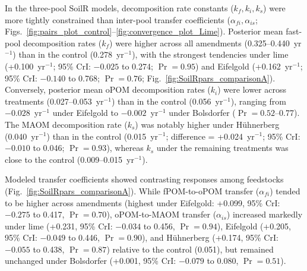 \documentclass[preprint,12pt]{elsarticle}
\begin{document}
In the three-pool SoilR models, decomposition rate constants ($k_f, k_i, k_s$) were more tightly constrained than inter-pool transfer coefficients ($\alpha_{fi}, \alpha_{is}$; Figs.~\ref{fig:pairs_plot_control}--\ref{fig:convergence_plot_Lime}). Posterior mean fast-pool decomposition rates ($k_f$) were higher across all amendments (0.325--0.440~yr$^{-1}$) than in the control (0.278~yr$^{-1}$), with the strongest tendencies under lime (+0.100~yr$^{-1}$; 95\% CrI: $-0.025$ to 0.274; $\Pr = 0.95$) and Eifelgold (+0.162~yr$^{-1}$; 95\% CrI: $-0.140$ to 0.768; $\Pr = 0.76$; Fig.~\ref{fig:SoilRpars_comparisonA}). Conversely, posterior mean oPOM decomposition rates ($k_i$) were lower across treatments (0.027--0.053~yr$^{-1}$) than in the control (0.056~yr$^{-1}$), ranging from $-0.028$~yr$^{-1}$ under Eifelgold to $-0.002$~yr$^{-1}$ under Bolsdorfer ($\Pr = 0.52$--0.77). The MAOM decomposition rate ($k_s$) was notably higher under H\"uhnerberg (0.040~yr$^{-1}$) than in the control (0.015~yr$^{-1}$; difference = +0.024~yr$^{-1}$; 95\% CrI: $-0.010$ to 0.046; $\Pr = 0.93$), whereas $k_s$ under the remaining treatments was close to the control (0.009--0.015~yr$^{-1}$).

Modeled transfer coefficients showed contrasting responses among feedstocks (Fig.~\ref{fig:SoilRpars_comparisonA}). While fPOM-to-oPOM transfer ($\alpha_{fi}$) tended to be higher across amendments (highest under Eifelgold: +0.099, 95\% CrI: $-0.275$ to 0.417, $\Pr = 0.70$), oPOM-to-MAOM transfer ($\alpha_{is}$) increased markedly under lime (+0.231, 95\% CrI: $-0.034$ to 0.456, $\Pr = 0.94$), Eifelgold (+0.205, 95\% CrI: $-0.049$ to 0.446, $\Pr = 0.90$), and H\"uhnerberg (+0.174, 95\% CrI: $-0.055$ to 0.438, $\Pr = 0.87$) relative to the control (0.051), but remained unchanged under Bolsdorfer (+0.001, 95\% CrI: $-0.079$ to 0.080, $\Pr = 0.51$).
\end{document}

